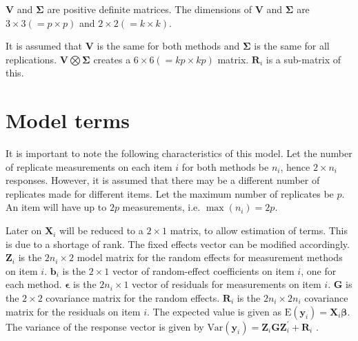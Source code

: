 $\boldsymbol{V}$ and $\boldsymbol{\Sigma}$ are positive
definite matrices. The dimensions of $\boldsymbol{V}$ and
$\boldsymbol{\Sigma}$ are $3 \times 3 ( = p \times p )$ and $ 2 \times
2 (= k \times k)$.

It is assumed that $\boldsymbol{V}$ is the same for both methods and $\boldsymbol{\Sigma}$ is
the same for all replications.
$\boldsymbol{V} \bigotimes \boldsymbol{\Sigma}$ creates a $ 6 \times 6 ( = kp \times
kp)$ matrix.
$\boldsymbol{R}_{i}$ is a sub-matrix of this.

\section{Model terms}
It is important to note the following characteristics of this model.
Let the number of replicate measurements on each item $i$ for both methods be $n_i$, hence $2 \times n_i$ responses. However, it is assumed that there may be a different number of replicates made for different items. Let the maximum number of replicates be $p$. An item will have up to $2p$ measurements, i.e. $\max(n_{i}) = 2p$.

Later on $\boldsymbol{X}_i$ will be reduced to a $2 \times 1$ matrix, to allow estimation of terms. This is due to a shortage of rank. The fixed effects vector can be modified accordingly.
 $\boldsymbol{Z}_i$ is the $2n_i \times  2$ model matrix for the random effects for measurement methods on item $i$.
 $\boldsymbol{b}_i$ is the $2 \times  1$ vector of random-effect coefficients on item $i$, one for each method.
 $\boldsymbol{\epsilon}$  is the $2n_i \times  1$ vector of residuals for measurements on item $i$.
 $\boldsymbol{G}$ is the $2 \times  2$ covariance matrix for the random effects.
 $\boldsymbol{R}_i$ is the $2n_i \times  2n_i$ covariance matrix for the residuals on item $i$.
The expected value is given as $\mbox{E}(\boldsymbol{y}_i) = \boldsymbol{X}_i\boldsymbol{\beta}.$ \citep{hamlett}
 The variance of the response vector is given by $\mbox{Var}(\boldsymbol{y}_i)  = \boldsymbol{Z}_i \boldsymbol{G} \boldsymbol{Z}_i^{\prime} + \boldsymbol{R}_i$ \citep{hamlett}.



